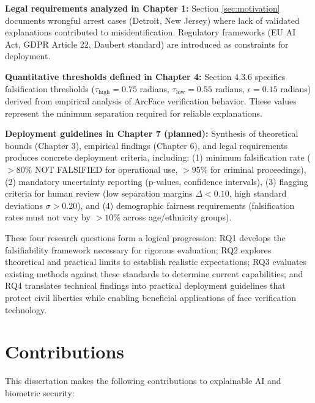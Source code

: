 \vspace{0.3cm}
\noindent\textbf{Legal requirements analyzed in Chapter 1:} Section \ref{sec:motivation} documents wrongful arrest cases (Detroit, New Jersey) where lack of validated explanations contributed to misidentification. Regulatory frameworks (EU AI Act, GDPR Article 22, Daubert standard) are introduced as constraints for deployment.

\vspace{0.3cm}
\noindent\textbf{Quantitative thresholds defined in Chapter 4:} Section 4.3.6 specifies falsification thresholds ($\tau_{\text{high}} = 0.75$ radians, $\tau_{\text{low}} = 0.55$ radians, $\epsilon = 0.15$ radians) derived from empirical analysis of ArcFace verification behavior. These values represent the minimum separation required for reliable explanations.

\vspace{0.3cm}
\noindent\textbf{Deployment guidelines in Chapter 7 (planned):} Synthesis of theoretical bounds (Chapter 3), empirical findings (Chapter 6), and legal requirements produces concrete deployment criteria, including: (1) minimum falsification rate ($>80\%$ NOT FALSIFIED for operational use, $>95\%$ for criminal proceedings), (2) mandatory uncertainty reporting (p-values, confidence intervals), (3) flagging criteria for human review (low separation margins $\Delta < 0.10$, high standard deviations $\sigma > 0.20$), and (4) demographic fairness requirements (falsification rates must not vary by $>10\%$ across age/ethnicity groups).

\vspace{0.5cm}

These four research questions form a logical progression: RQ1 develops the falsifiability framework necessary for rigorous evaluation; RQ2 explores theoretical and practical limits to establish realistic expectations; RQ3 evaluates existing methods against these standards to determine current capabilities; and RQ4 translates technical findings into practical deployment guidelines that protect civil liberties while enabling beneficial applications of face verification technology.

\section{Contributions}
\label{sec:contributions}

This dissertation makes the following contributions to explainable AI and biometric security:

